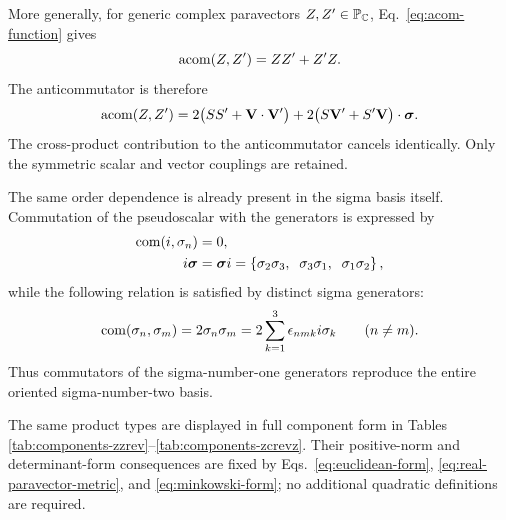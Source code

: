 More generally, for generic complex paravectors
\(Z,Z'\in\mathbb{P}_{\mathbb{C}}\), Eq.\ \eqref{eq:acom-function} gives
\begin{equation}
\operatorname{acom}\!\left(Z,Z'\right)=ZZ'+Z'Z.
\label{eq:paravector-anticommutator-expansion}
\end{equation}
The anticommutator is therefore
\begin{equation}
\operatorname{acom}\!\left(Z,Z'\right)
=2\bigl(S S'+\mathbf{V}\cdot\mathbf{V}'\bigr)
+2\bigl(S\mathbf{V}'+S'\mathbf{V}\bigr)\cdot\mathbf{\bm{\sigma}}.
\label{eq:paravector-anticommutator}
\end{equation}
The cross-product contribution to the anticommutator cancels identically.
Only the symmetric scalar and vector couplings are retained.

The same order dependence is already present in the sigma basis itself.
Commutation of the pseudoscalar with the generators is expressed by
\begin{align*}
\operatorname{com}\!\left(i,\sigma_n\right) &= 0,\\
i\mathbf{\bm{\sigma}} &= \mathbf{\bm{\sigma}} i
=\left\{\sigma_2\sigma_3,\mkern10mu \sigma_3\sigma_1,\mkern10mu \sigma_1\sigma_2\right\},
\end{align*}
while the following relation is satisfied by distinct sigma generators:
\begin{equation*}
\operatorname{com}\!\left(\sigma_n,\sigma_m\right)=2\sigma_n\sigma_m=2\sum_{k=1}^3\epsilon_{nmk}i\sigma_k
\qquad (n\neq m).
\end{equation*}
Thus commutators of the sigma-number-one generators reproduce the entire
oriented sigma-number-two basis.

The same product types are displayed in full component form in Tables
\ref{tab:components-zzrev}--\ref{tab:components-zcrevz}. Their positive-norm
and determinant-form consequences are fixed by Eqs.\
\eqref{eq:euclidean-form}, \eqref{eq:real-paravector-metric}, and
\eqref{eq:minkowski-form}; no additional quadratic definitions are required.
